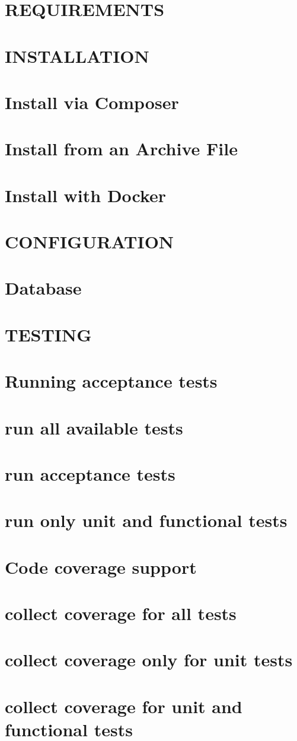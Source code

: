\chapter{REQUIREMENTS}
\chapter{INSTALLATION}
\chapter{Install via Composer}
\chapter{Install from an Archive File}
\chapter{Install with Docker}
\chapter{CONFIGURATION}
\chapter{Database}
\chapter{TESTING}
\chapter{Running  acceptance tests}
\chapter{run all available tests}
\chapter{run acceptance tests}
\chapter{run only unit and functional tests}
\chapter{Code coverage support}
\chapter{collect coverage for all tests}
\chapter{collect coverage only for unit tests}
\chapter{collect coverage for unit and functional tests}
